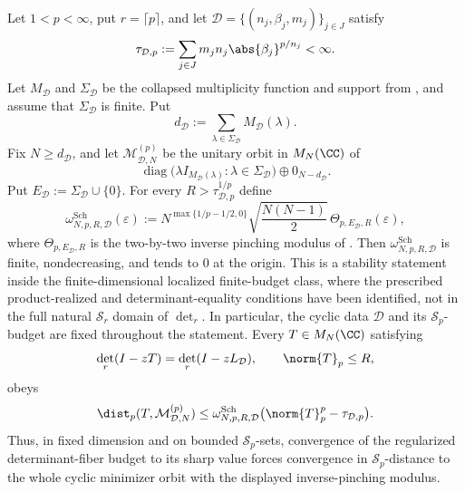 \begin{theorem}
  \label{thm:finite-dimensional-schatten-stability}
  Let \(1<p<\infty\), put \(r=\lceil p\rceil\), and let
  \(\mathcal D=\{(n_j,\beta_j,m_j)\}_{j\in J}\) satisfy
  \[
    \tau_{\mathcal D,p}
    :=\sum_{j\in J}m_jn_j\abs{\beta_j}^{p/n_j}<\infty .
  \]
  Let \(M_{\mathcal D}\) and \(\Sigma_{\mathcal D}\) be the collapsed
  multiplicity function and support from
  , and assume that
  \(\Sigma_{\mathcal D}\) is finite. Put
  \[
    d_{\mathcal D}
    :=\sum_{\lambda\in\Sigma_{\mathcal D}}M_{\mathcal D}(\lambda).
  \]
  Fix \(N\ge d_{\mathcal D}\), and let
  \(\mathcal M_{\mathcal D,N}^{(p)}\) be the unitary orbit in
  \(M_N(\CC)\) of
  \[
    \operatorname{diag}\bigl(
      \lambda I_{M_{\mathcal D}(\lambda)}:
      \lambda\in\Sigma_{\mathcal D}\bigr)\oplus0_{N-d_{\mathcal D}}.
  \]
  Put \(E_{\mathcal D}:=\Sigma_{\mathcal D}\cup\{0\}\). For every
  \(R>\tau_{\mathcal D,p}^{1/p}\) define
  \[
    \omega_{N,p,R,\mathcal D}^{\mathrm{Sch}}(\varepsilon)
    :=
    N^{\max\{1/p-1/2,0\}}
    \sqrt{\frac{N(N-1)}{2}}\,
    \Theta_{p,E_{\mathcal D},R}(\varepsilon),
  \]
  where \(\Theta_{p,E_{\mathcal D},R}\) is the two-by-two inverse
  pinching modulus of
  . Then
  \(\omega_{N,p,R,\mathcal D}^{\mathrm{Sch}}\) is finite,
  nondecreasing, and tends to \(0\) at the origin. This is a stability
  statement inside the finite-dimensional localized finite-budget class, where
  the prescribed product-realized and determinant-equality conditions have been
  identified, not in the full natural \(\mathcal S_r\)
  domain of \(\det_r\). In particular, the cyclic data \(\mathcal D\) and its
  \(\mathcal S_p\)-budget are fixed throughout the statement. Every
  \(T\in M_N(\CC)\) satisfying
  \[
    \det_r(I-zT)=\det_r(I-zL_{\mathcal D}),
    \qquad
    \norm{T}_p\le R,
  \]
  obeys
  \[
    \dist_p(T,\mathcal M_{\mathcal D,N}^{(p)})
    \le
    \omega_{N,p,R,\mathcal D}^{\mathrm{Sch}}
      \bigl(\norm{T}_p^p-\tau_{\mathcal D,p}\bigr).
  \]
  Thus, in fixed dimension and on bounded \(\mathcal S_p\)-sets,
  convergence of the regularized determinant-fiber budget to its sharp
  value forces convergence in \(\mathcal S_p\)-distance to the whole cyclic
  minimizer orbit with the displayed inverse-pinching modulus.
\end{theorem}

